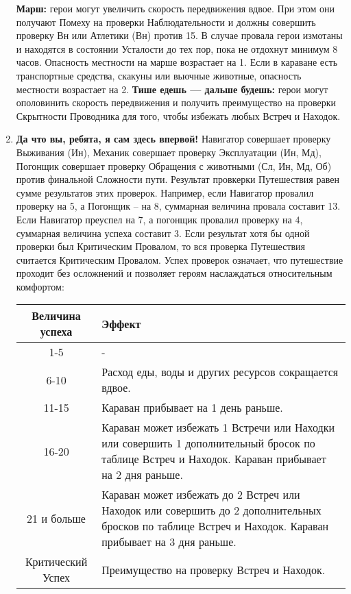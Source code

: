 \begin{enumerate}
\begin{tcolorbox}
\end{tcolorbox}
\textbf{Марш:} герои могут увеличить скорость передвижения вдвое. При этом они получают Помеху на проверки Наблюдательности и должны совершить проверку Вн или Атлетики (Вн) против 15. В случае провала герои измотаны и находятся в состоянии Усталости до тех пор, пока не отдохнут минимум 8 часов. Опасность местности на марше возрастает на 1. Если в караване есть транспортные средства, скакуны или вьючные животные, опасность местности возрастает на 2.
\newline \textbf{Тише едешь — дальше будешь:} герои могут ополовинить скорость передвижения и получить преимущество на проверки Скрытности Проводника для того, чтобы избежать любых Встреч и Находок.

\item \textbf{Да что вы, ребята, я сам здесь впервой!} Навигатор совершает проверку Выживания (Ин), Механик совершает проверку Эксплуатации (Ин, Мд), Погонщик совершает проверку Обращения с животными (Сл, Ин, Мд, Об) против финальной Сложности пути. Результат провкерки Путешествия равен сумме результатов этих проверок. Например, если Навигатор провалил проверку на 5, а Погонщик – на 8, суммарная величина провала составит 13. Если Навигатор преуспел на 7, а погонщик провалил проверку на 4, суммарная величина успеха составит 3.
\newline Если результат хотя бы одной проверки был Критическим Провалом, то вся проверка Путешествия считается Критическим Провалом.
\newline
Успех проверок означает, что путешествие проходит без осложнений и позволяет героям наслаждаться относительным комфортом:
\begin{center}
\begin{tabular}{|c|p{10cm}|}
\hline
Величина успеха & Эффект \\ \hline
1-5 & - \\ \hline
6-10 & Расход еды, воды и других ресурсов сокращается вдвое. \\ \hline
11-15 & Караван прибывает на 1 день раньше. \\ \hline
16-20 & Караван может избежать 1 Встречи или Находки или совершить 1 дополнительный бросок по таблице Встреч и Находок. Караван прибывает на 2 дня раньше. \\ \hline
21 и больше & Караван может избежать до 2 Встреч или Находок или совершить до 2 дополнительных бросков по таблице Встреч и Находок. Караван прибывает на 3 дня раньше. \\ \hline
Критический Успех & Преимущество на проверку Встреч и Находок. \\ \hline

\end{tabular}
\end{center}
\end{enumerate}
